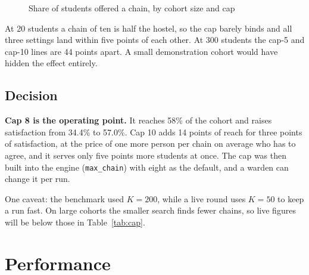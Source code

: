 \begin{figure}[H]
\centering
{}
\caption{Share of students offered a chain, by cohort size and cap}
\label{fig:scale}
\end{figure}

At 20 students a chain of ten is half the hostel, so the cap barely
binds and all three settings land within five points of each other. At
300 students the cap-5 and cap-10 lines are 44 points apart. A small
demonstration cohort would have hidden the effect entirely.

\subsection{Decision}

\textbf{Cap 8 is the operating point.} It reaches 58\% of the cohort and
raises satisfaction from 34.4\% to 57.0\%. Cap 10 adds 14 points of
reach for three points of satisfaction, at the price of one more person
per chain on average who has to agree, and it serves only five points
more students at once.
The cap was then built into the engine (\texttt{max\_chain}) with eight as
the default, and a warden can change it per run.

One caveat: the benchmark used $K = 200$, while a live round uses
$K = 50$ to keep a run fast. On large cohorts the smaller search finds
fewer chains, so live figures will be below those in
Table~\ref{tab:cap}.

\section{Performance}
\label{sec:performance}


